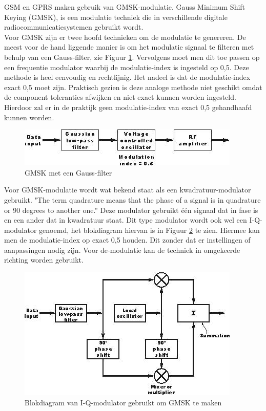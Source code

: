 \documentclass{article}
\begin{document}
\noindent GSM en GPRS maken gebruik van GMSK-modulatie. Gauss Minimum Shift Keying (GMSK), is een modulatie techniek die in verschillende digitale radiocommunicatiesystemen gebruikt wordt.\\

\noindent Voor GMSK zijn er twee hoofd technieken om de modulatie te genereren. De meest voor de hand liggende manier is om het modulatie signaal te filteren met behulp van een Gauss-filter, zie Figuur \ref{fig:gmsk01}. Vervolgens moet men dit toe passen op een frequentie modulator waarbij de modulatie-index is ingesteld op 0,5. Deze methode is heel eenvoudig en rechtlijnig. Het nadeel is dat de modulatie-index exact 0,5 moet zijn. Praktisch gezien is deze analoge methode niet geschikt omdat de component toleranties afwijken en niet exact kunnen worden ingesteld. Hierdoor zal er in de praktijk geen modulatie-index van exact 0,5 gehandhaafd kunnen worden. \cite{gmsk} \\

\begin{figure}[H]
\centering
\includegraphics[width=0.85 \textwidth]{img/GMSK01.jpg}
\caption{GMSK met een Gauss-filter}
\label{fig:gmsk01}
\end{figure}

\noindent Voor GMSK-modulatie wordt wat bekend staat als een kwadratuur-modulator gebruikt. "The term quadrature means that the phase of a signal is in quadrature or 90 degrees to another one.'' Deze modulator gebruikt één signaal dat in fase is en een ander dat in kwadratuur staat. Dit type modulator wordt ook wel een I-Q-modulator genoemd, het blokdiagram hiervan is in Figuur \ref{fig:gmsk} te zien. Hiermee kan men de modulatie-index op exact 0,5 houden. Dit zonder dat er instellingen of aanpassingen nodig zijn. Voor de-modulatie kan de techniek in omgekeerde richting worden gebruikt. \cite{gmsk}

\begin{figure}[H]
\centering
\includegraphics[width=0.85 \textwidth]{img/GMSK.jpg}
\caption{Blokdiagram van I-Q-modulator gebruikt om GMSK te maken}
\label{fig:gmsk}
\end{figure}
\end{document}

